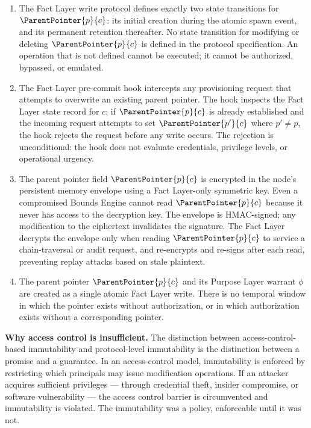 \documentclass[12pt]{article}
\begin{document}
\begin{enumerate}
    \item[(W1) \textbf{No modification operation defined.}] The Fact Layer write protocol defines exactly two state transitions for $\ParentPointer{p}{c}$: its initial creation during the atomic spawn event, and its permanent retention thereafter. No state transition for modifying or deleting $\ParentPointer{p}{c}$ is defined in the protocol specification. An operation that is not defined cannot be executed; it cannot be authorized, bypassed, or emulated.

    \item[(W2) \textbf{Pre-commit hook rejection.}] The Fact Layer pre-commit hook intercepts any provisioning request that attempts to overwrite an existing parent pointer. The hook inspects the Fact Layer state record for $c$; if $\ParentPointer{p}{c}$ is already established and the incoming request attempts to set $\ParentPointer{p'}{c}$ where $p' \neq p$, the hook rejects the request before any write occurs. The rejection is unconditional: the hook does not evaluate credentials, privilege levels, or operational urgency.

    \item[(W3) \textbf{Sealed memory envelope.}] The parent pointer field $\ParentPointer{p}{c}$ is encrypted in the node's persistent memory envelope using a Fact Layer-only symmetric key. Even a compromised Bounds Engine cannot read $\ParentPointer{p}{c}$ because it never has access to the decryption key. The envelope is HMAC-signed; any modification to the ciphertext invalidates the signature. The Fact Layer decrypts the envelope only when reading $\ParentPointer{p}{c}$ to service a chain-traversal or audit request, and re-encrypts and re-signs after each read, preventing replay attacks based on stale plaintext.

    \item[(W4) \textbf{Atomic provisioning.}] The parent pointer $\ParentPointer{p}{c}$ and its Purpose Layer warrant $\phi$ are created as a single atomic Fact Layer write. There is no temporal window in which the pointer exists without authorization, or in which authorization exists without a corresponding pointer.
\end{enumerate}

\medskip
\noindent\textbf{Why access control is insufficient.} The distinction between access-control-based immutability and protocol-level immutability is the distinction between a promise and a guarantee. In an access-control model, immutability is enforced by restricting which principals may issue modification operations. If an attacker acquires sufficient privileges — through credential theft, insider compromise, or software vulnerability — the access control barrier is circumvented and immutability is violated. The immutability was a policy, enforceable until it was not.
\end{document}
